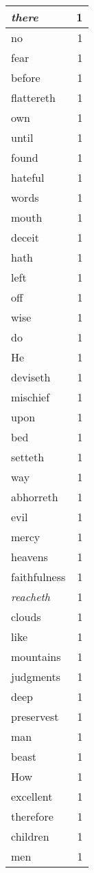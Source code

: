 \begin{center}
\begin{longtable}{l|r}
\emph{there} & 1 \\ \hline
no & 1 \\ \hline
fear & 1 \\ \hline
before & 1 \\ \hline
flattereth & 1 \\ \hline
own & 1 \\ \hline
until & 1 \\ \hline
found & 1 \\ \hline
hateful & 1 \\ \hline
words & 1 \\ \hline
mouth & 1 \\ \hline
deceit & 1 \\ \hline
hath & 1 \\ \hline
left & 1 \\ \hline
off & 1 \\ \hline
wise & 1 \\ \hline
do & 1 \\ \hline
He & 1 \\ \hline
deviseth & 1 \\ \hline
mischief & 1 \\ \hline
upon & 1 \\ \hline
bed & 1 \\ \hline
setteth & 1 \\ \hline
way & 1 \\ \hline
abhorreth & 1 \\ \hline
evil & 1 \\ \hline
mercy & 1 \\ \hline
heavens & 1 \\ \hline
faithfulness & 1 \\ \hline
\emph{reacheth} & 1 \\ \hline
clouds & 1 \\ \hline
like & 1 \\ \hline
mountains & 1 \\ \hline
judgments & 1 \\ \hline
deep & 1 \\ \hline
preservest & 1 \\ \hline
man & 1 \\ \hline
beast & 1 \\ \hline
How & 1 \\ \hline
excellent & 1 \\ \hline
therefore & 1 \\ \hline
children & 1 \\ \hline
men & 1 \\ \hline

\end{longtable}
\end{center}

